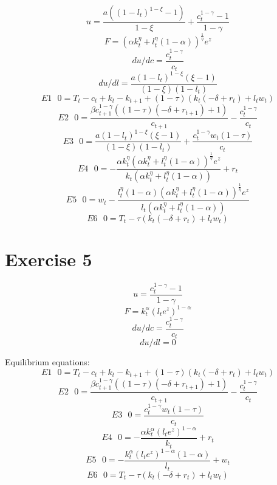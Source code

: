 \documentclass[a4paper]{article}
\begin{document}
$$ u =  \frac{a \left(\left(1 - l_{t}\right)^{1 - \xi} - 1\right)}{1 - \xi} + \frac{c_{t}^{1 - \gamma} - 1}{1 - \gamma} $$
$$ F =  \left(\alpha k_{t}^{\eta} + l_{t}^{\eta} \left(1 - \alpha\right)\right)^{\frac{1}{\eta}} e^{z} $$
$$ du/dc =  \frac{c_{t}^{1 - \gamma}}{c_{t}} $$
$$ du/dl =  \frac{a \left(1 - l_{t}\right)^{1 - \xi} \left(\xi - 1\right)}{\left(1 - \xi\right) \left(1 - l_{t}\right)} $$
$$ E1 \text{  }
 0 =  T_{t} - c_{t} + k_{t} - k_{t+1} + \left(1 - \tau\right) \left(k_{t} \left(- \delta + r_{t}\right) + l_{t} w_{t}\right) $$
$$ E2 \text{  }
 0 =  \frac{\beta c_{t+1}^{1 - \gamma} \left(\left(1 - \tau\right) \left(- \delta + r_{t+1}\right) + 1\right)}{c_{t+1}} - \frac{c_{t}^{1 - \gamma}}{c_{t}} $$
$$ E3 \text{  }
 0 =  \frac{a \left(1 - l_{t}\right)^{1 - \xi} \left(\xi - 1\right)}{\left(1 - \xi\right) \left(1 - l_{t}\right)} + \frac{c_{t}^{1 - \gamma} w_{t} \left(1 - \tau\right)}{c_{t}} $$
$$ E4 \text{  }
 0 =  - \frac{\alpha k_{t}^{\eta} \left(\alpha k_{t}^{\eta} + l_{t}^{\eta} \left(1 - \alpha\right)\right)^{\frac{1}{\eta}} e^{z}}{k_{t} \left(\alpha k_{t}^{\eta} + l_{t}^{\eta} \left(1 - \alpha\right)\right)} + r_{t} $$
$$ E5 \text{  }
 0 =  w_{t} - \frac{l_{t}^{\eta} \left(1 - \alpha\right) \left(\alpha k_{t}^{\eta} + l_{t}^{\eta} \left(1 - \alpha\right)\right)^{\frac{1}{\eta}} e^{z}}{l_{t} \left(\alpha k_{t}^{\eta} + l_{t}^{\eta} \left(1 - \alpha\right)\right)} $$
$$ E6 \text{  }
 0 =  T_{t} - \tau \left(k_{t} \left(- \delta + r_{t}\right) + l_{t} w_{t}\right) $$

\section*{Exercise 5}
$$ u =  \frac{c_{t}^{1 - \gamma} - 1}{1 - \gamma} $$
$$ F =  k_{t}^{\alpha} \left(l_{t} e^{z}\right)^{1 - \alpha} $$
$$ du/dc  =  \frac{c_{t}^{1 - \gamma}}{c_{t}} $$
$$ du/dl  =  0 $$

Equilibrium equations:
$$ E1 \text{  }
 0 =  T_{t} - c_{t} + k_{t} - k_{t+1} + \left(1 - \tau\right) \left(k_{t} \left(- \delta + r_{t}\right) + l_{t} w_{t}\right) $$
$$ E2 \text{  }
 0 =  \frac{\beta c_{t+1}^{1 - \gamma} \left(\left(1 - \tau\right) \left(- \delta + r_{t+1}\right) + 1\right)}{c_{t+1}} - \frac{c_{t}^{1 - \gamma}}{c_{t}} $$
$$ E3 \text{  }
 0 =  \frac{c_{t}^{1 - \gamma} w_{t} \left(1 - \tau\right)}{c_{t}} $$
$$ E4 \text{  }
 0 =  - \frac{\alpha k_{t}^{\alpha} \left(l_{t} e^{z}\right)^{1 - \alpha}}{k_{t}} + r_{t} $$
$$ E5 \text{  }
 0 =  - \frac{k_{t}^{\alpha} \left(l_{t} e^{z}\right)^{1 - \alpha} \left(1 - \alpha\right)}{l_{t}} + w_{t} $$
$$ E6 \text{  }
 0 =  T_{t} - \tau \left(k_{t} \left(- \delta + r_{t}\right) + l_{t} w_{t}\right) $$
\end{document}
